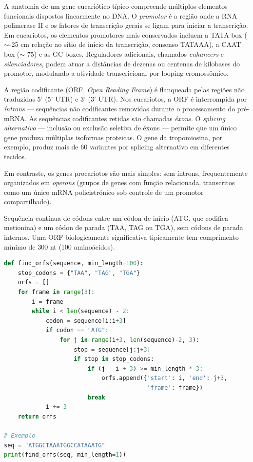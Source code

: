 A anatomia de um gene eucariótico típico compreende múltiplos elementos funcionais dispostos
linearmente no DNA. O \emph{promotor} é a região onde a RNA polimerase II e os fatores de
transcrição gerais se ligam para iniciar a transcrição. Em eucariotos, os elementos
promotores mais conservados incluem a TATA box ($\sim$-25 em relação ao sítio de início da
transcrição, consenso TATAAA), a CAAT box ($\sim$-75) e as GC boxes. Reguladores
adicionais, chamados \emph{enhancers} e \emph{silenciadores}, podem atuar a distâncias de
dezenas ou centenas de kilobases do promotor, modulando a atividade transcricional por
looping cromossômico.

A região codificante (ORF, \textit{Open Reading Frame}) é flanqueada pelas regiões não
traduzidas 5' (5' UTR) e 3' (3' UTR). Nos eucariotos, a ORF é interrompida por
\emph{íntrons} --- sequências não codificantes removidas durante o processamento do
pré-mRNA. As sequências codificantes retidas são chamadas \emph{éxons}. O
\emph{splicing alternativo} --- inclusão ou exclusão seletiva de éxons --- permite que um
único gene produza múltiplas isoformas proteicas. O gene da tropomiosina, por exemplo,
produz mais de 60 variantes por splicing alternativo em diferentes tecidos.

Em contraste, os genes procariotos são mais simples: sem íntrons, frequentemente
organizados em \emph{operons} (grupos de genes com função relacionada, transcritos como
um único mRNA policistrónico sob controle de um promotor compartilhado).

\begin{definicaoenv}
Sequência contínua de códons entre um códon de início (ATG, que codifica metionina) e um
códon de parada (TAA, TAG ou TGA), sem códons de parada internos. Uma ORF biologicamente
significativa tipicamente tem comprimento mínimo de 300 nt (100 aminoácidos).
\end{definicaoenv}

\begin{lstlisting}[language=Python, caption=Identificacao de ORFs em sequencia de DNA]
def find_orfs(sequence, min_length=100):
    stop_codons = {"TAA", "TAG", "TGA"}
    orfs = []
    for frame in range(3):
        i = frame
        while i < len(sequence) - 2:
            codon = sequence[i:i+3]
            if codon == "ATG":
                for j in range(i+3, len(sequence)-2, 3):
                    stop = sequence[j:j+3]
                    if stop in stop_codons:
                        if (j - i + 3) >= min_length * 3:
                            orfs.append({'start': i, 'end': j+3,
                                         'frame': frame})
                        break
            i += 3
    return orfs

# Exemplo
seq = "ATGGCTAAATGGCCATAAATG"
print(find_orfs(seq, min_length=1))
\end{lstlisting}


